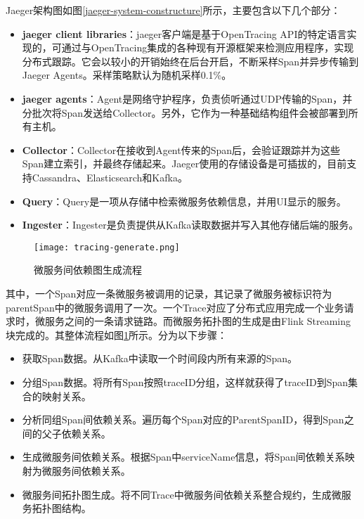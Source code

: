 Jaeger架构图如图\ref{jaeger-system-constructure}所示，主要包含以下几个部分：
\begin{itemize}
    \item [（1）] \textbf{jaeger client libraries}：jaeger客户端是基于OpenTracing API的特定语言实现的，可通过与OpenTracing集成的各种现有开源框架来检测应用程序，实现分布式跟踪。它会以较小的开销始终在后台开启，不断采样Span并异步传输到Jaeger Agents。采样策略默认为随机采样0.1\%。
    \item [（2）]\textbf{jaeger agents}：Agent是网络守护程序，负责侦听通过UDP传输的Span，并分批次将Span发送给Collector。另外，它作为一种基础结构组件会被部署到所有主机。
    \item [（3）]\textbf{Collector}：Collector在接收到Agent传来的Span后，会验证跟踪并为这些Span建立索引，并最终存储起来。Jaeger使用的存储设备是可插拔的，目前支持Cassandra、Elasticsearch和Kafka。
    \item [（4）]\textbf{Query}：Query是一项从存储中检索微服务依赖信息，并用UI显示的服务。
    \item [（5）]\textbf{Ingester}：Ingester是负责提供从Kafka读取数据并写入其他存储后端的服务。
\end{itemize}

\begin{figure}[htbp]
    \centering
    \texttt{[image: tracing-generate.png]}
    \caption{微服务间依赖图生成流程\label{tracing-generate}}
\end{figure}
其中，一个Span对应一条微服务被调用的记录，其记录了微服务被标识符为parentSpan中的微服务调用了一次。一个Trace对应了分布式应用完成一个业务请求时，微服务之间的一条请求链路。而微服务拓扑图的生成是由Flink Streaming块完成的。其整体流程如图\ref{tracing-generate}所示。分为以下步骤：
\begin{itemize}
    \item [（1）]获取Span数据。从Kafka中读取一个时间段内所有来源的Span。
    \item [（2）]分组Span数据。将所有Span按照traceID分组，这样就获得了traceID到Span集合的映射关系。
    \item [（3）]分析同组Span间依赖关系。遍历每个Span对应的ParentSpanID，得到Span之间的父子依赖关系。
    \item [（4）]生成微服务间依赖关系。根据Span中serviceName信息，将Span间依赖关系映射为微服务间依赖关系。
    \item [（5）]微服务间拓扑图生成。将不同Trace中微服务间依赖关系整合规约，生成微服务拓扑图结构。
\end{itemize}

